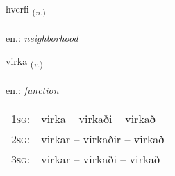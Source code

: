 \documentclass[frontgrid, backgrid]{flacards}\usepackage[]{graphicx}\usepackage[]{xcolor}
\begin{document}
\renewcommand{\flhead}{\vskip5pt \fboxsep=0pt {\small\bfseries\footnotesize Nafnorð | Noun}}
\renewcommand{\fcfoot}{\vskip5pt \fboxsep=0pt \hspace{2pt}{\small\bfseries\footnotesize 2K}}

\renewcommand{\blhead}{\vskip5pt {\small\bfseries\footnotesize Nafnorð | Noun }}
\renewcommand{\bcfoot}{\vskip5pt \hspace{2pt}{\small\bfseries\footnotesize 2K}}


{hverfi \small{\textsubscript{(\textit{n.})}} \\[1ex] %
\textphonetic{[kʰvɛrvɪ]} \\
en.: \emph{neighborhood} \\  [2ex]
\renewcommand*{\arraystretch}{0.8}
}

\renewcommand{\flhead}{\vskip5pt \fboxsep=0pt {\small\bfseries\footnotesize Sagnorð | Verb}}
\renewcommand{\fcfoot}{\vskip5pt \fboxsep=0pt \hspace{2pt}{\small\bfseries\footnotesize 2K}}

\renewcommand{\blhead}{\vskip5pt {\small\bfseries\footnotesize Sagnorð | Verb }}
\renewcommand{\bcfoot}{\vskip5pt \hspace{2pt}{\small\bfseries\footnotesize 2K}}


{virka \small{\textsubscript{(\textit{v.})}} \\[1ex] %
\textphonetic{[vɪr̥ka]} \\
en.: \emph{function} \\  [2ex]
\renewcommand*{\arraystretch}{0.8}
\begin{tabular}{p{1cm}l}
\textsc{1sg}: & virka -- virkaði -- virkað \\ 
\textsc{2sg}: & virkar -- virkaðir -- virkað \\ 
\textsc{3sg}: & virkar -- virkaði -- virkað \\ 
\end{tabular}
}
\end{document}
